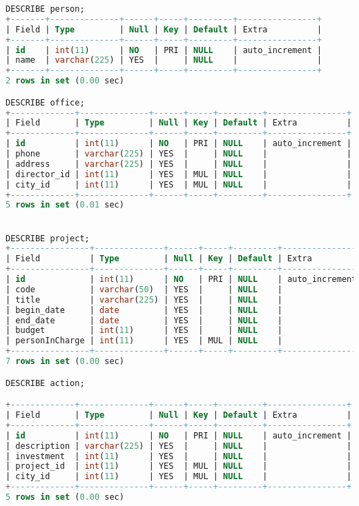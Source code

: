 \documentclass[12pt]{article}
\begin{document}
\begin{lstlisting}[language=SQL]
DESCRIBE person;
+-------+--------------+------+-----+---------+----------------+
| Field | Type         | Null | Key | Default | Extra          |
+-------+--------------+------+-----+---------+----------------+
| id    | int(11)      | NO   | PRI | NULL    | auto_increment |
| name  | varchar(225) | YES  |     | NULL    |                |
+-------+--------------+------+-----+---------+----------------+
2 rows in set (0.00 sec)

DESCRIBE office;
+-------------+--------------+------+-----+---------+----------------+
| Field       | Type         | Null | Key | Default | Extra          |
+-------------+--------------+------+-----+---------+----------------+
| id          | int(11)      | NO   | PRI | NULL    | auto_increment |
| phone       | varchar(225) | YES  |     | NULL    |                |
| address     | varchar(225) | YES  |     | NULL    |                |
| director_id | int(11)      | YES  | MUL | NULL    |                |
| city_id     | int(11)      | YES  | MUL | NULL    |                |
+-------------+--------------+------+-----+---------+----------------+
5 rows in set (0.01 sec)


DESCRIBE project;
+----------------+--------------+------+-----+---------+----------------+
| Field          | Type         | Null | Key | Default | Extra          |
+----------------+--------------+------+-----+---------+----------------+
| id             | int(11)      | NO   | PRI | NULL    | auto_increment |
| code           | varchar(50)  | YES  |     | NULL    |                |
| title          | varchar(225) | YES  |     | NULL    |                |
| begin_date     | date         | YES  |     | NULL    |                |
| end_date       | date         | YES  |     | NULL    |                |
| budget         | int(11)      | YES  |     | NULL    |                |
| personInCharge | int(11)      | YES  | MUL | NULL    |                |
+----------------+--------------+------+-----+---------+----------------+
7 rows in set (0.00 sec)

DESCRIBE action;

+-------------+--------------+------+-----+---------+----------------+
| Field       | Type         | Null | Key | Default | Extra          |
+-------------+--------------+------+-----+---------+----------------+
| id          | int(11)      | NO   | PRI | NULL    | auto_increment |
| description | varchar(225) | YES  |     | NULL    |                |
| investment  | int(11)      | YES  |     | NULL    |                |
| project_id  | int(11)      | YES  | MUL | NULL    |                |
| city_id     | int(11)      | YES  | MUL | NULL    |                |
+-------------+--------------+------+-----+---------+----------------+
5 rows in set (0.00 sec)


\end{lstlisting}
\end{document}
